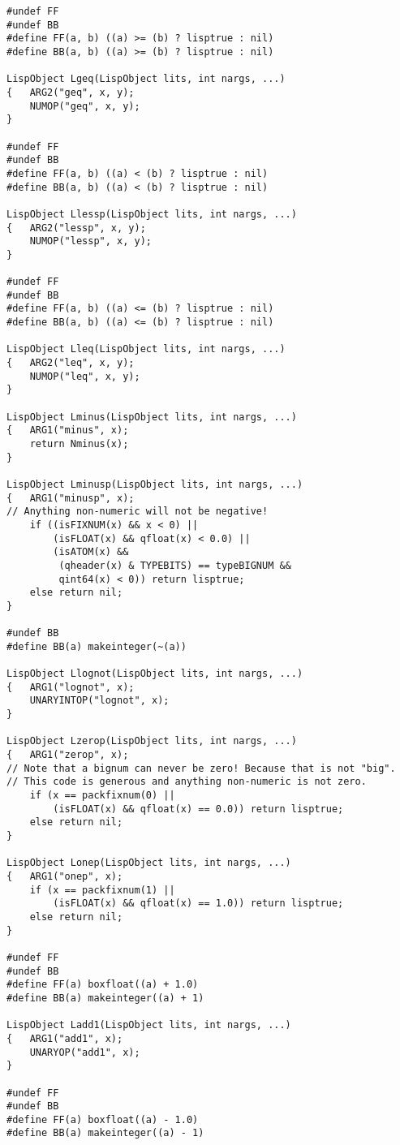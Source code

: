 {\begin{verbatim}
#undef FF
#undef BB
#define FF(a, b) ((a) >= (b) ? lisptrue : nil)
#define BB(a, b) ((a) >= (b) ? lisptrue : nil)

LispObject Lgeq(LispObject lits, int nargs, ...)
{   ARG2("geq", x, y);
    NUMOP("geq", x, y);
}

#undef FF
#undef BB
#define FF(a, b) ((a) < (b) ? lisptrue : nil)
#define BB(a, b) ((a) < (b) ? lisptrue : nil)

LispObject Llessp(LispObject lits, int nargs, ...)
{   ARG2("lessp", x, y);
    NUMOP("lessp", x, y);
}

#undef FF
#undef BB
#define FF(a, b) ((a) <= (b) ? lisptrue : nil)
#define BB(a, b) ((a) <= (b) ? lisptrue : nil)

LispObject Lleq(LispObject lits, int nargs, ...)
{   ARG2("leq", x, y);
    NUMOP("leq", x, y);
}

LispObject Lminus(LispObject lits, int nargs, ...)
{   ARG1("minus", x);
    return Nminus(x);
}

LispObject Lminusp(LispObject lits, int nargs, ...)
{   ARG1("minusp", x);
// Anything non-numeric will not be negative!
    if ((isFIXNUM(x) && x < 0) ||
        (isFLOAT(x) && qfloat(x) < 0.0) ||
        (isATOM(x) &&
         (qheader(x) & TYPEBITS) == typeBIGNUM &&
         qint64(x) < 0)) return lisptrue;
    else return nil;
}

#undef BB
#define BB(a) makeinteger(~(a))

LispObject Llognot(LispObject lits, int nargs, ...)
{   ARG1("lognot", x);
    UNARYINTOP("lognot", x);
}

LispObject Lzerop(LispObject lits, int nargs, ...)
{   ARG1("zerop", x);
// Note that a bignum can never be zero! Because that is not "big".
// This code is generous and anything non-numeric is not zero.
    if (x == packfixnum(0) ||
        (isFLOAT(x) && qfloat(x) == 0.0)) return lisptrue;
    else return nil;
}

LispObject Lonep(LispObject lits, int nargs, ...)
{   ARG1("onep", x);
    if (x == packfixnum(1) ||
        (isFLOAT(x) && qfloat(x) == 1.0)) return lisptrue;
    else return nil;
}

#undef FF
#undef BB
#define FF(a) boxfloat((a) + 1.0)
#define BB(a) makeinteger((a) + 1)

LispObject Ladd1(LispObject lits, int nargs, ...)
{   ARG1("add1", x);
    UNARYOP("add1", x);
}

#undef FF
#undef BB
#define FF(a) boxfloat((a) - 1.0)
#define BB(a) makeinteger((a) - 1)


\end{verbatim}}
